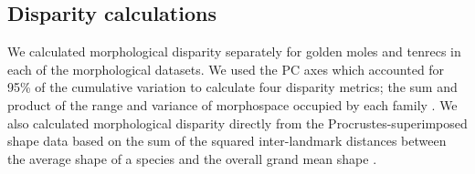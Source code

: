 \documentclass[12pt,a4paper]{article}
\begin{document}
	
\subsection{Disparity calculations}

	We calculated morphological disparity separately for golden moles and tenrecs in each of the morphological datasets. We used the PC axes which accounted for 95\% of the cumulative variation to calculate four disparity metrics; the sum and product of the range and variance of morphospace occupied by each family \citep{Brusatte2008, Foth2012, Ruta2013}. 
	We also calculated morphological disparity directly from the Procrustes-superimposed shape data based on the sum of the squared inter-landmark distances between the average shape of a species and the overall grand mean shape \citep[SSqDist,][]{Zelditch2012}. 
\end{document}
